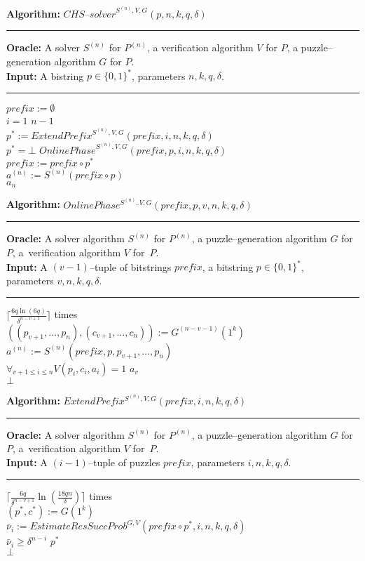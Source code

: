 \begin{codeblock}
  \textbf{Algorithm:} $\mathit{CHS\text{--}solver}^{S^{(n)},V,G}(p, n, k, q, \delta)$
  \medskip\hrule
  \textbf{Oracle:} A solver $S^{(n)}$ for $P^{(n)}$, a verification algorithm $V$ for $P$, a puzzle--generation algorithm $G$ for $P$.\\
  \textbf{Input:}  A bistring $p \in \{0,1\}^{*}$, parameters $n, k, q, \delta$.
  \medskip\hrule
  $\mathit{prefix} := \emptyset$\\
  \For $i = 1$ \To $n\!-\!1$ \Do \\
  \IndI $p^* := \mathit{ExtendPrefix}^{S^{(n)}, V, G}(\mathit{prefix}, i, n, k, q, \delta)$\\
  \IndI \If $p^* = \bot$ \Then \Return $\mathit{OnlinePhase}^{S^{(n)}, V, G}(\mathit{prefix}, p, i, n, k, q, \delta)$ \\
  \IndI \Else $\mathit{prefix} := \mathit{prefix} \circ p^*$\\
  $ a^{(n)} := S^{(n)}(\mathit{prefix} \circ p)$ \\
  \Return $a_n$
\end{codeblock}
%
\begin{codeblock}
  \textbf{Algorithm:} $\mathit{OnlinePhase^{S^{(n)}, V, G}(\mathit{prefix}, p, v, n, k, q, \delta)}$
  \medskip \hrule
  \textbf{Oracle:} A solver algorithm $S^{(n)}$ for $P^{(n)}$, a puzzle--generation algorithm $G$ for $P$, a~verification algorithm $V$ for~$P$.\\
  \textbf{Input:} A $(v-1)$--tuple of bitstrings $\mathit{prefix}$, a bitstring $p \in \{0,1\}^{*}$, \\ parameters $v, n, k, q, \delta$.
  \medskip\hrule
  \Repeat $\Big\lceil\frac{6q \ln (6q)}{\delta^{n-v+1}}\Big\rceil$ times \\
  \IndI $((p_{v+1}, \dotsc, p_{n}),(c_{v+1}, \dots, c_n)) := G^{(n-v-1)}(1^k)$\\
  \IndI $a^{(n)} := S^{(n)}(\mathit{prefix}, p, p_{v+1}, \dotsc, p_n)$\\
  \IndI \If $\forall_{v+1 \leq i \leq n} V(p_i, c_i, a_i) = 1$ \Then \Return $a_v$\\
  \Return $\bot$
\end{codeblock}
%
\begin{codeblock}
  \textbf{Algorithm:} $\mathit{ExtendPrefix^{S^{(n)}, V, G}(prefix, i, n, k, q, \delta)}$
  \medskip \hrule
  \textbf{Oracle:} A solver algorithm $S^{(n)}$ for $P^{(n)}$, a puzzle--generation algorithm $G$ for $P$, a~verification algorithm $V$ for~$P$.\\
  \textbf{Input:} A $(i-1)$--tuple of puzzles $\mathit{prefix}$, parameters $i, n, k, q, \delta$.
  \medskip\hrule
  \Repeat $\Big\lceil \frac{6q}{\delta^{n-v+1}} \ln (\frac{18qn}{\delta}) \Big\rceil$ times \\
  \IndI $(p^*, c^*) := G(1^k) $\\
  \IndI $\bar{\nu}_i := \mathit{EstimateResSuccProb}^{G,V}(\mathit{prefix} \circ p^*, i, n, k, q, \delta)$\\
  \IndI \If $\bar{\nu}_i \geq \delta^{n-i}$ \Then \Return $p^*$ \\
  \Return $\bot$
\end{codeblock}
